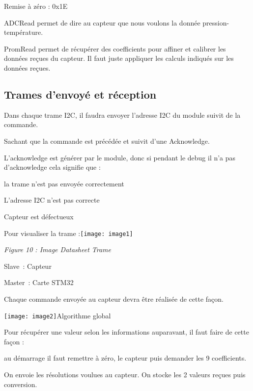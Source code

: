 \noindent Remise \`{a} z\'{e}ro : 0x1E

\noindent ADCRead permet de dire au capteur que nous voulons la donn\'{e}e pression-temp\'{e}rature.

\noindent PromRead permet de r\'{e}cup\'{e}rer des coefficients pour affiner et calibrer les donn\'{e}es re\c{c}ues du capteur. Il faut juste appliquer les calculs indiqu\'{e}s sur les donn\'{e}es re\c{c}ues.\underbar{}

\noindent 
\subsection{Trames d'envoy\'{e} et r\'{e}ception}

\noindent 

\noindent Dans chaque trame I2C, il faudra envoyer l'adresse I2C du module suivit de la commande.

\noindent Sachant que la commande est pr\'{e}c\'{e}d\'{e}e et suivit d'une Acknowledge.

\noindent L'acknowledge est g\'{e}n\'{e}rer par le module, donc si pendant le debug il n'a pas d'acknowledge cela signifie que :

\noindent  la trame n'est pas envoy\'{e}e correctement

\noindent  L'adresse I2C n'est pas correcte

\noindent  Capteur est d\'{e}fectueux

\noindent Pour visualiser la trame :\texttt{[image: image1]}

\noindent \textit{Figure 10 : Image Datasheet Trame}

\noindent 

\noindent Slave~: Capteur

\noindent Master~: Carte STM32

\noindent Chaque commande envoy\'{e}e au capteur devra \^{e}tre r\'{e}alis\'{e}e de cette fa\c{c}on.

\noindent 

\noindent \texttt{[image: image2]}Algorithme global

\noindent Pour r\'{e}cup\'{e}rer une valeur selon les informations auparavant, il faut faire de cette fa\c{c}on :

\noindent au d\'{e}marrage il faut remettre \`{a} z\'{e}ro, le capteur puis demander les 9 coefficients.

\noindent On envoie les r\'{e}solutions voulues au capteur. On stocke les 2 valeurs re\c{c}ues puis conversion.

